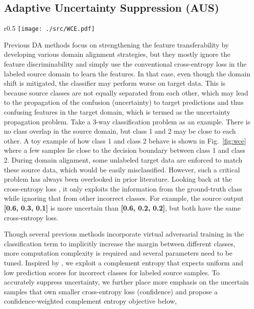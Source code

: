 \documentclass[runningheads]{llncs}
\begin{document}
\subsection{Adaptive Uncertainty Suppression (AUS)}
	\label{sec:aus}
	\begin{wrapfigure}{r}{0.5\textwidth}
		\centering
		\texttt{[image: ./src/WCE.pdf]}
		\caption{Mitigating the effects of uncertainty propagation from source. [\textcolor{blue}{blue}: source, \textcolor{red}{red}: target, \textcolor{hui}{gray}: adversarial alignment.]}
		\label{fig:wce}
	\end{wrapfigure}
Previous DA methods focus on strengthening the feature transferability by developing various domain alignment strategies, but they mostly ignore the feature discriminability and simply use the conventional cross-entropy loss in the labeled source domain to learn the features.
In that case, even though the domain shift is mitigated, the classifier may perform worse on target data.
This is because source classes are not equally separated from each other, which may lead to the propagation of the confusion (uncertainty) to target predictions and thus confusing features in the target domain, which is termed as the uncertainty propagation problem.
Take a 3-way classification problem as an example. 
There is no class overlap in the source domain, but class 1 and 2 may be close to each other.
A toy example of how class 1 and class 2 behave is shown in Fig.~\ref{fig:wce} where a few samples lie close to the decision boundary between class 1 and class 2.
During domain alignment, some unlabeled target data are enforced to match these source data, which would be easily misclassified. 
However, such a critical problem has always been overlooked in prior literature. 
Looking back at the cross-entropy loss , it only exploits the information from the ground-truth class while ignoring that from other incorrect classes.
For example, the source output \textbf{[0.6, 0.3, 0.1]} is more uncertain than \textbf{[0.6, 0.2, 0.2]}, but both have the same cross-entropy loss.


Though several previous methods \cite{kumar2018co,shu2018dirt} incorporate virtual adversarial training \cite{miyato2018virtual} in the classification term to implicitly increase the margin between different classes, more computation complexity is required and several parameters need to be tuned.
Inspired by \cite{chen2019complement}, we exploit a complement entropy that expects uniform and low prediction scores for incorrect classes for labeled source samples.
To accurately suppress uncertainty, we further place more emphasis on the uncertain samples that own smaller cross-entropy loss (confidence) and propose a confidence-weighted complement entropy objective below,
\end{document}

